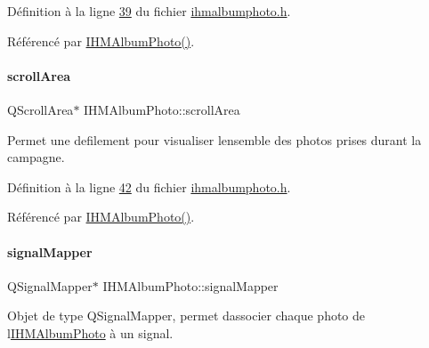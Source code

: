Définition à la ligne \hyperlink{ihmalbumphoto_8h_source_l00039}{39} du fichier \hyperlink{ihmalbumphoto_8h_source}{ihmalbumphoto.\+h}.



Référencé par \hyperlink{ihmalbumphoto_8cpp_source_l00011}{I\+H\+M\+Album\+Photo()}.

\mbox{\label{class_i_h_m_album_photo_a9ed730123be1c9ca6f7aa078ec9e0556}} 
\paragraph{\texorpdfstring{scroll\+Area}{scrollArea}}
{\footnotesize\ttfamily Q\+Scroll\+Area$\ast$ I\+H\+M\+Album\+Photo\+::scroll\+Area\hspace{0.3cm}{\ttfamily [private]}}



Permet une defilement pour visualiser l\textquotesingle{}ensemble des photos prises durant la campagne. 



Définition à la ligne \hyperlink{ihmalbumphoto_8h_source_l00042}{42} du fichier \hyperlink{ihmalbumphoto_8h_source}{ihmalbumphoto.\+h}.



Référencé par \hyperlink{ihmalbumphoto_8cpp_source_l00011}{I\+H\+M\+Album\+Photo()}.

\mbox{\label{class_i_h_m_album_photo_a184d7d26edab19328980b55ce727811b}} 
\paragraph{\texorpdfstring{signal\+Mapper}{signalMapper}}
{\footnotesize\ttfamily Q\+Signal\+Mapper$\ast$ I\+H\+M\+Album\+Photo\+::signal\+Mapper\hspace{0.3cm}{\ttfamily [private]}}



Objet de type Q\+Signal\+Mapper, permet d\textquotesingle{}associer chaque photo de l\textquotesingle{}\hyperlink{class_i_h_m_album_photo}{I\+H\+M\+Album\+Photo} à un signal. 



